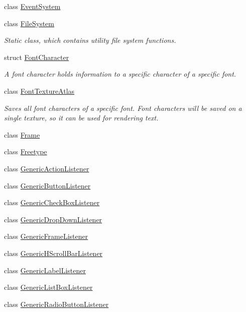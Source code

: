 \begin{DoxyCompactItemize}
class \mbox{\hyperlink{classec_1_1_event_system}{Event\+System}}
\item 
class \mbox{\hyperlink{classec_1_1_file_system}{File\+System}}
\begin{DoxyCompactList}\small\item\em Static class, which contains utility file system functions. \end{DoxyCompactList}\item 
struct \mbox{\hyperlink{structec_1_1_font_character}{Font\+Character}}
\begin{DoxyCompactList}\small\item\em A font character holds information to a specific character of a specific font. \end{DoxyCompactList}\item 
class \mbox{\hyperlink{classec_1_1_font_texture_atlas}{Font\+Texture\+Atlas}}
\begin{DoxyCompactList}\small\item\em Saves all font characters of a specific font. Font characters will be saved on a single texture, so it can be used for rendering text. \end{DoxyCompactList}\item 
class \mbox{\hyperlink{classec_1_1_frame}{Frame}}
\item 
class \mbox{\hyperlink{classec_1_1_freetype}{Freetype}}
\item 
class \mbox{\hyperlink{classec_1_1_generic_action_listener}{Generic\+Action\+Listener}}
\item 
class \mbox{\hyperlink{classec_1_1_generic_button_listener}{Generic\+Button\+Listener}}
\item 
class \mbox{\hyperlink{classec_1_1_generic_check_box_listener}{Generic\+Check\+Box\+Listener}}
\item 
class \mbox{\hyperlink{classec_1_1_generic_drop_down_listener}{Generic\+Drop\+Down\+Listener}}
\item 
class \mbox{\hyperlink{classec_1_1_generic_frame_listener}{Generic\+Frame\+Listener}}
\item 
class \mbox{\hyperlink{classec_1_1_generic_h_scroll_bar_listener}{Generic\+H\+Scroll\+Bar\+Listener}}
\item 
class \mbox{\hyperlink{classec_1_1_generic_label_listener}{Generic\+Label\+Listener}}
\item 
class \mbox{\hyperlink{classec_1_1_generic_list_box_listener}{Generic\+List\+Box\+Listener}}
\item 
class \mbox{\hyperlink{classec_1_1_generic_radio_button_listener}{Generic\+Radio\+Button\+Listener}}

\end{DoxyCompactItemize}
